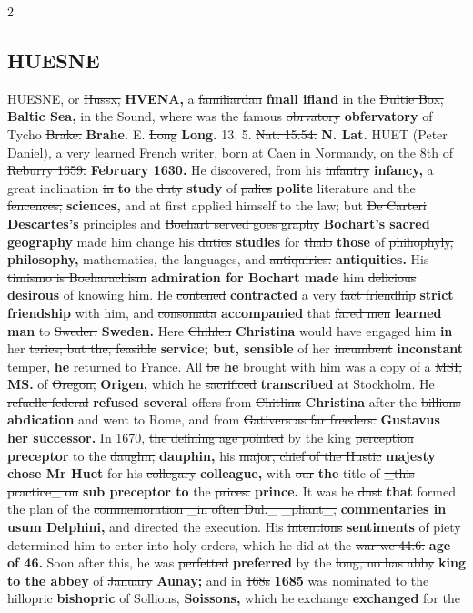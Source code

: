 \documentclass[10pt]{article}
\begin{document}
\begin{multicols}{2}
\subsection*{HUESNE}
HUESNE, or \sout{Hussx,} \textbf{HVENA,} a \sout{familiardan} \textbf{fmall ifland} in the \sout{Dultie Box,} \textbf{Baltic Sea,} in the Sound, where was the famous \sout{obrvatory} \textbf{obfervatory} of Tycho \sout{Brake.} \textbf{Brahe.} E. \sout{Long} \textbf{Long.} 13. 5. \sout{Nat. 15.54.} \textbf{N. Lat.} HUET (Peter Daniel), a very learned French writer, born at Caen in Normandy, on the 8th of \sout{Reburry 1659.} \textbf{February 1630.} He discovered, from his \sout{infantry} \textbf{infancy,} a great inclination \sout{in} \textbf{to} the \sout{duty} \textbf{study} of \sout{palies} \textbf{polite} literature and the \sout{fencences,} \textbf{sciences,} and at first applied himself to the law; but \sout{De Carteri} \textbf{Descartes's} principles and \sout{Boehart served goes graphy} \textbf{Bochart's sacred geography} made him change his \sout{duties} \textbf{studies} for \sout{thalo} \textbf{those} of \sout{phihophyly,} \textbf{philosophy,} mathematics, the languages, and \sout{antiquiries.} \textbf{antiquities.} His \sout{timismo is Boeharachism} \textbf{admiration for Bochart made} him \sout{delicious} \textbf{desirous} of knowing him. He \sout{contened} \textbf{contracted} a very \sout{fact friendhip} \textbf{strict friendship} with him, and \sout{consomata} \textbf{accompanied} that \sout{fared men} \textbf{learned man} to \sout{Sweder.} \textbf{Sweden.} Here \sout{Chihlen} \textbf{Christina} would have engaged him \textbf{in} her \sout{teries; but the, feasible} \textbf{service; but, sensible} of her \sout{incumbent} \textbf{inconstant} temper, \textbf{he} returned to France. All \sout{be} \textbf{he} brought with him was a copy of a \sout{MSI,} \textbf{MS.} of \sout{Oregon,} \textbf{Origen,} which he \sout{sacrificed} \textbf{transcribed} at Stockholm. He \sout{refuelle federal} \textbf{refused several} offers from \sout{Chitlina} \textbf{Christina} after the \sout{billions} \textbf{abdication} and went to Rome, and from \sout{Gativers as far freeders.} \textbf{Gustavus her successor.} In 1670, \sout{the defining age pointed} by the king \sout{perception} \textbf{preceptor} to the \sout{daughn,} \textbf{dauphin,} his \sout{major, chief of the Hustic} \textbf{majesty chose Mr Huet} for his \sout{collegary} \textbf{colleague,} with \sout{our} \textbf{the} title of \sout{\_this practice\_ on} \textbf{sub preceptor to} the \sout{prices.} \textbf{prince.} It was he \sout{dust} \textbf{that} formed the plan of the \sout{commemoration \_in often Dul.\_ \_pliant\_,} \textbf{commentaries in usum Delphini,} and directed the execution. His \sout{intentions} \textbf{sentiments} of piety determined him to enter into holy orders, which he did at the \sout{war we 44.6.} \textbf{age of 46.} Soon after this, he was \sout{perfetted} \textbf{preferred} by the \sout{long, no has abby} \textbf{king to the abbey} of \sout{January} \textbf{Aunay;} and in \sout{168s} \textbf{1685} was nominated to the \sout{hillopric} \textbf{bishopric} of \sout{Sollions,} \textbf{Soissons,} which he \sout{exchange} \textbf{exchanged} for the 
\end{multicols}
\end{document}
